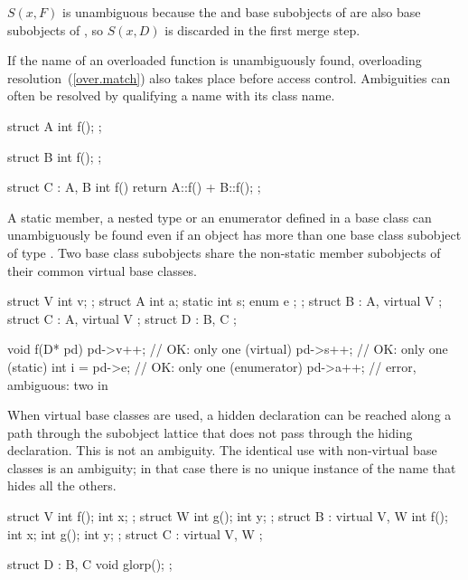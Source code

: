 $S(x,F)$ is unambiguous because the  and  base
subobjects of  are also base subobjects of , so
$S(x,D)$ is discarded in the first merge step.
\exitexample

\pnum
{}%
If the name of an overloaded function is unambiguously found,
overloading resolution~(\ref{over.match}) also takes place before access
control.
%
%
%
Ambiguities can often be resolved by qualifying a name with its class name.
\enterexample
\begin{codeblock}
struct A {
  int f();
};

\end{codeblock}
\begin{codeblock}
struct B {
  int f();
};

\end{codeblock}
\begin{codeblock}
struct C : A, B {
  int f() { return A::f() + B::f(); }
};
\end{codeblock}
\exitexample

\pnum
\enternote
A static member, a nested type or an enumerator defined in a base class
 can unambiguously be found even if an object has more than one
base class subobject of type . Two base class subobjects share
the non-static member subobjects of their common virtual base classes.
\exitnote
\enterexample
\begin{codeblock}
struct V {
  int v;
};
struct A {
  int a;
  static int   s;
  enum { e };
};
struct B : A, virtual V { };
struct C : A, virtual V { };
struct D : B, C { };

void f(D* pd) {
  pd->v++;          // OK: only one  (virtual)
  pd->s++;          // OK: only one  (static)
  int i = pd->e;    // OK: only one  (enumerator)
  pd->a++;          // error, ambiguous: two  in 
}
\end{codeblock}
\exitexample

\pnum
\enternote
{}%
When virtual base classes are used, a hidden declaration can be reached
along a path through the subobject lattice that does not pass through
the hiding declaration. This is not an ambiguity. The identical use with
non-virtual base classes is an ambiguity; in that case there is no
unique instance of the name that hides all the others.
\exitnote
\enterexample
\begin{codeblock}
struct V { int f();  int x; };
struct W { int g();  int y; };
struct B : virtual V, W {
  int f();  int x;
  int g();  int y;
};
struct C : virtual V, W { };

struct D : B, C { void glorp(); };
\end{codeblock}

